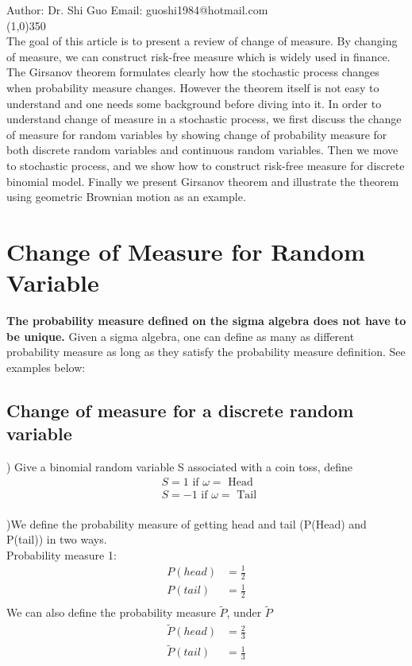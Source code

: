 \documentclass[a4paper]{article}
\begin{document}
Author: Dr. Shi Guo  \hspace{30mm} Email: guoshi1984@hotmail.com\\
\line(1,0){350}\\

The goal of this article is to present a review of change of measure. By changing of measure, we can construct risk-free measure which is widely used in finance. The Girsanov theorem formulates clearly how the stochastic process changes when probability measure changes. However the theorem itself
is not easy to understand and one needs some background before diving into it. In order to understand change of measure in a stochastic process, we first discuss the change of measure for random variables by showing change of probability measure for both discrete random variables and continuous random variables. Then we move to stochastic process, and we show how to construct risk-free measure for discrete binomial model. Finally we present Girsanov theorem and illustrate the theorem using geometric Brownian motion as an example.

\section{Change of Measure for Random Variable }

{\bf The probability measure defined on the sigma algebra does not have to be unique.} Given a sigma algebra, one can define as many as different probability measure as long as they satisfy the probability measure definition. See examples below:
\subsection{Change of measure for a discrete random variable}
) Give a binomial random variable S associated with a coin toss, define 
\begin{align*}
&S = 1  \textrm{ if } \omega = \textrm{ Head } \\
&S = -1 \textrm{ if } \omega = \textrm{ Tail } \\
\end{align*}

)We define the probability measure of getting head and tail (P(Head) and P(tail)) in two ways. \\
Probability measure 1:\\
\begin{align*}
P(head) & = \frac{1}{2}\\ 
P(tail) & = \frac{1}{2}\\
\end{align*}
We can also define the probability measure $\tilde P$, under $\tilde P$\\ 
\begin{align*}
\tilde P(head) & = \frac{2}{3}\\ 
\tilde P(tail) & = \frac{1}{3}\\
\end{align*}
 
\end{document}
